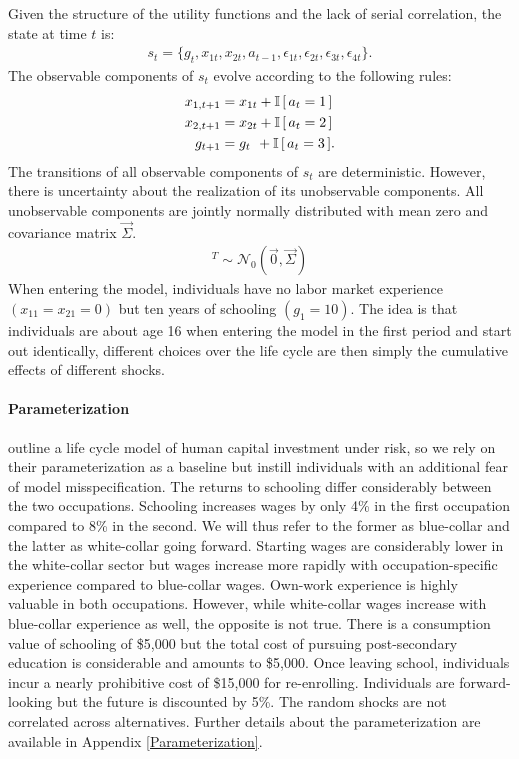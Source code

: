 \noindent Given the structure of the utility functions and the lack of serial correlation, the state at time $t$ is:
%
\begin{align*}
s_t = \{g_t,x_{1t},x_{2t},a_{t - 1},\epsilon_{1t},\epsilon_{2t},\epsilon_{3t},\epsilon_{4t}\}.
\end{align*}
%
The observable components of $s_t$ evolve according to the following rules:
%
\begin{align*}
    x_{1,t+1}  &= x_{1t} + \mathbb{I}\,[\,a_t = 1\,] \\
x_{2,t+1} &= x_{2t} + \mathbb{I}\,[\,a_t = 2\,] \\
g_{t+1}   &= g_{t\phantom{2}}    +  \mathbb{I}\,[\,a_t = 3\,].
\end{align*}
%
The transitions of all observable components of $s_t$ are deterministic. However, there is uncertainty about the realization of its unobservable components. All unobservable components are jointly normally distributed with mean zero and covariance matrix $\vec{\Sigma}$.
%
\begin{align*}
[\epsilon_{1t}, \epsilon_{2t}, \epsilon_{3t}, \epsilon_{4t}]^T \sim \mathcal{N}_0(\vec{0}, \vec{\Sigma})
\end{align*}
%
When entering the model, individuals have no labor market experience $(x_{11} = x_{21} = 0)$ but ten years of schooling $(g_1 = 10)$. The idea is that individuals are about age 16 when entering the model in the first period and start out identically, different choices over the life cycle are then simply the cumulative effects of different shocks.

\paragraph{Parameterization} \citet{Keane.1994} outline a life cycle model of human capital investment under risk, so we rely on their parameterization as a baseline but instill individuals with an additional fear of model misspecification. The returns to schooling differ considerably between the two occupations. Schooling increases wages by only 4\% in the first occupation compared to 8\% in the second. We will thus refer to the former as blue-collar and the latter as white-collar going forward. Starting wages are considerably lower in the white-collar sector but wages increase more rapidly with occupation-specific experience compared to blue-collar wages. Own-work experience is highly valuable in both occupations. However, while white-collar wages increase with blue-collar experience as well, the opposite is not true. There is a consumption value of schooling of \$5,000 but the total cost of pursuing post-secondary education is considerable and amounts to \$5,000. Once leaving school, individuals incur a nearly prohibitive cost of \$15,000 for re-enrolling. Individuals are forward-looking but the future is discounted by 5\%. The random shocks are not correlated across alternatives. Further details about the parameterization are available in Appendix \ref{Parameterization}.

